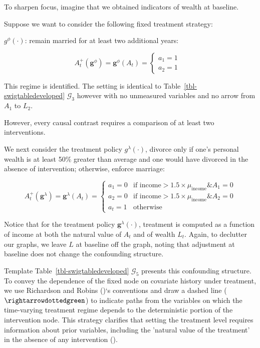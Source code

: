 \documentclass[
  single column]{article}
\begin{document}
To sharpen focus, imagine that we obtained indicators of wealth at
baseline.

Suppose we want to consider the following fixed treatment strategy:

\(g^\phi(\cdot)\): remain married for at least two additional years:

\[
A_t^{+}(\mathbf{g}^\phi) = \mathbf{g}^\phi (A_{t}) = \begin{cases} 
   a_{1} = 1 & \\ 
   a_{2} = 1 &   
\end{cases}
\]

This regime is identified. The setting is identical to
Table~\ref{tbl-swigtabledeveloped} \(\mathcal{G}_3\) however with no
unmeasured variables and no arrow from \(A_1\) to \(L_2\).

However, every causal contrast requires a comparison of at least two
interventions.

We next consider the treatment policy \(g^{\lambda}(\cdot)\), divorce
only if one's personal wealth is at least 50\% greater than average and
one would have divorced in the absence of intervention; otherwise,
enforce marriage:

\[
A_t^{+}(\mathbf{g}^{\lambda}) = \mathbf{g}^{\lambda}(A_{t}) = \begin{cases} 
   a_{1} = 0 & \text{if income} > 1.5 \times  \mu_{\text{income}} \& A_1 = 0 \\ 
   a_{2} = 0 & \text{if income} > 1.5 \times  \mu_{\text{income}} \& A_2 = 0 \\ 
   a_{t} = 1 & \text{otherwise} 
\end{cases}
\]

Notice that for the treatment policy \(\mathbf{g}^\lambda(\cdot)\),
treatment is computed as a function of income at both the natural value
of \(A_t\) and of wealth \(L_t\). Again, to declutter our graphs, we
leave \(L\) at baseline off the graph, noting that adjustment at
baseline does not change the confounding structure.

Template Table~\ref{tbl-swigtabledeveloped} \(\mathcal{G}_5\) presents
this confounding structure. To convey the dependence of the fixed node
on covariate history under treatment, we use Richardson and Robins
()`s conventions and draw a dashed
line (\(\rightarrowdottedgreen\)) to indicate paths from the variables
on which the time-varying treatment regime depends to the deterministic
portion of the intervention node. This strategy clarifies that setting
the treatment level requires information about prior variables,
including the 'natural value of the treatment' in the absence of any
intervention ().
\end{document}
